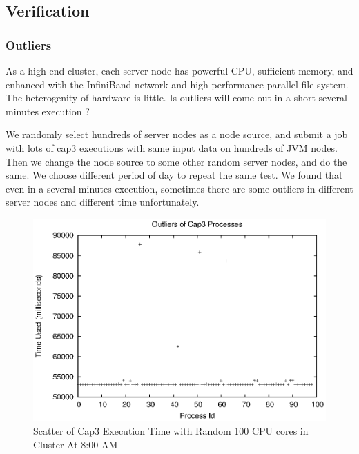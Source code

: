 \subsection{Verification}

\subsubsection{Outliers}
As a high end cluster, each server node has powerful CPU, sufficient memory, and enhanced with the InfiniBand network and high performance parallel file system. The heterogenity of hardware is little. Is outliers will come out in a short several minutes execution ?

We randomly select hundreds of server nodes as a node source, and submit a job with lots of cap3 executions with same input data on hundreds of JVM nodes. Then we change the node source to some other random server nodes, and do the same. We choose different period of day to repeat the same test. We found that even in a several minutes execution, sometimes there are some outliers in different server nodes and different time unfortunately.

\begin{figure}
\centering
\includegraphics[width=0.9\columnwidth]{figures/outliers.eps}
\caption{Scatter of Cap3 Execution Time with Random 100 CPU cores in Cluster At 8:00 AM}
\label{figure:outlier}
\end{figure}

